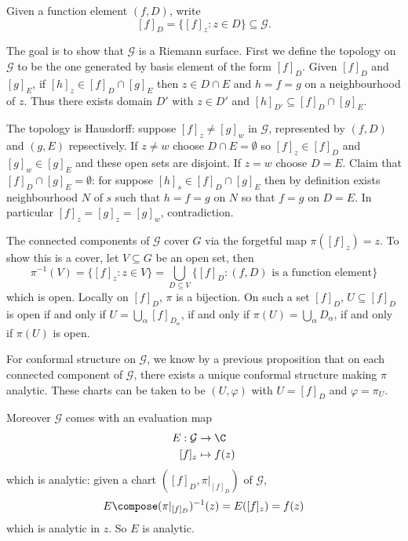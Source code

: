\documentclass[a4paper]{article}
\begin{document}
\begin{notation}
  Given a function element \((f, D)\), write
  \[
    [f]_D = \{[f]_z: z \in D\} \subseteq \mathcal G.
  \]
\end{notation}

The goal is to show that \(\mathcal G\) is a Riemann surface. First we define the topology on \(\mathcal G\) to be the one generated  by basis element of the form \([f]_D\). Given \([f]_D\) and \([g]_E\), if \([h]_z \in [f]_D \cap [g]_E\) then \(z \in D \cap E\) and \(h = f = g\) on a neighbourhood of \(z\). Thus there exists domain \(D'\) with \(z \in D'\) and \([h]_{D'} \subseteq [f]_D \cap [g]_E\).

The topology is Hausdorff: suppose \([f]_z \neq [g]_w\) in \(\mathcal G\), represented by \((f, D)\) and \((g, E)\) repsectively. If \(z \neq w\) choose \(D \cap E = \emptyset\) so \([f]_z \in [f]_D\) and \([g]_w \in [g]_E\) and these open sets are disjoint. If \(z = w\) choose \(D = E\). Claim that \([f]_D \cap [g]_E = \emptyset\): for suppose \([h]_s \in [f]_D \cap [g]_E\) then by definition exists neighbourhood \(N\) of \(s\) such that \(h = f = g\) on \(N\) so that \(f = g\) on \(D = E\). In particular \([f]_z = [g]_z = [g]_w\), contradiction.

The connected components of \(\mathcal G\) cover \(G\) via the forgetful map \(\pi([f]_z) = z\). To show this is a cover, let \(V \subseteq G\) be an open set, then
\[
  \pi^{-1}(V) = \{[f]_z: z \in V\} = \bigcup_{D \subseteq V} \{[f]_D: (f, D) \text{ is a function element}\}
\]
which is open. Locally on \([f]_D\), \(\pi\) is a bijection. On such a set \([f]_D\), \(U \subseteq [f]_D\) is open if and only if \(U = \bigcup_\alpha [f]_{D_\alpha}\), if and only if \(\pi(U) = \bigcup_\alpha D_\alpha\), if and only if \(\pi(U)\) is open.

For conformal structure on \(\mathcal G\), we know by a previous proposition that on each connected component of \(\mathcal G\), there exists a unique conformal structure making \(\pi\) analytic. These charts can be taken to be \((U, \varphi)\) with \(U = [f]_D\) and \(\varphi = \pi_U\).

Moreover \(\mathcal G\) comes with an evaluation map
\begin{align*}
  E: \mathcal G &\to \C \\
  [f]_z &\mapsto f(z)
\end{align*}
which is analytic: given a chart \(([f]_D, \pi|_{[f]_D})\) of \(\mathcal G\),
\[
  E \compose (\pi|_{[f]_D})^{-1}(z) = E([f]_z) = f(z)
\]
which is analytic in \(z\). So \(E\) is analytic.
\end{document}
